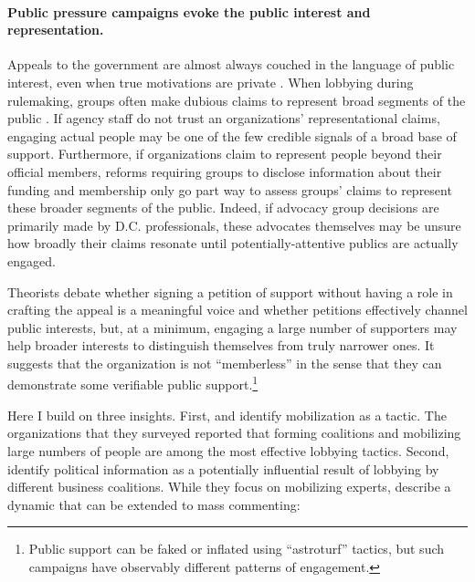\documentclass[
      12pt,
        ]{article}
\begin{document}
\hypertarget{public-pressure-campaigns-evoke-the-public-interest-and-representation.}{%
\paragraph{Public pressure campaigns evoke the public interest and representation.}\label{public-pressure-campaigns-evoke-the-public-interest-and-representation.}}

Appeals to the government are almost always couched in the language of
public interest, even when true motivations are private
\citep{Schattschneider1975}. When lobbying during rulemaking, groups often
make dubious claims to represent broad segments of the public
\citep{Seifter2016UCLA}. If agency staff do not trust an organizations'
representational claims, engaging actual people may be one of the few
credible signals of a broad base of support. Furthermore, if
organizations claim to represent people beyond their official members,
reforms requiring groups to disclose information about their funding and
membership \citep{Seifter2016UCLA} only go part way to assess groups' claims
to represent these broader segments of the public. Indeed, if advocacy
group decisions are primarily made by D.C. professionals, these
advocates themselves may be unsure how broadly their claims resonate
until potentially-attentive publics are actually engaged.

Theorists debate whether signing a petition of support without
having a role in crafting the appeal is a meaningful voice and whether
petitions effectively channel public interests, but, at a minimum,
engaging a large number of supporters may help broader interests to
distinguish themselves from truly narrower ones. It suggests that the
organization is not ``memberless'' \citep{Skocpol2003} in the sense that they
can demonstrate some verifiable public support.\footnote{Public support can be faked or inflated using ``astroturf'' tactics, but such campaigns have observably different patterns of engagement.}

Here I build on three insights. First, \citet{Furlong1997} and \citet{Kerwin2011}
identify mobilization as a tactic. The organizations that they surveyed
reported that forming coalitions and mobilizing large numbers of people
are among the most effective lobbying tactics. Second, \citet{Nelson2012}
identify political information as a potentially influential result of
lobbying by different business coalitions. While they focus on
mobilizing experts, \citet{Nelson2012} describe a dynamic that can be extended
to mass commenting:
\end{document}
